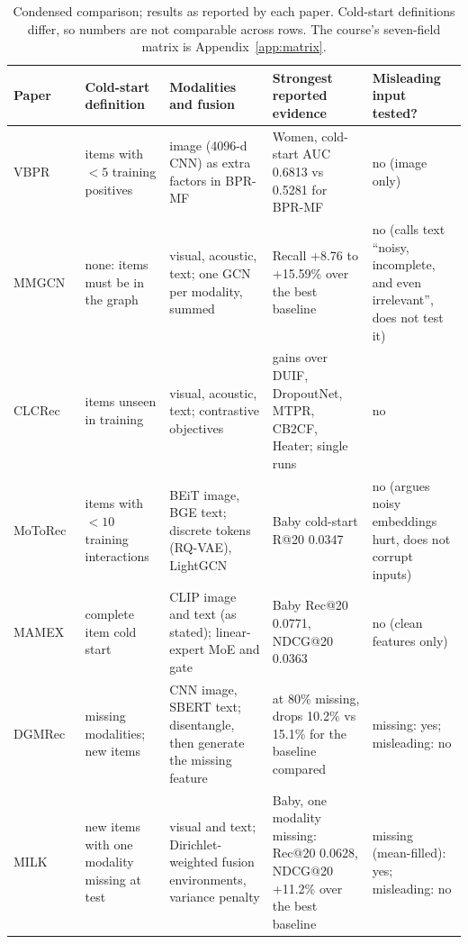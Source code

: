 \documentclass[conference]{IEEEtran}
\begin{document}
\begin{table}[!t]
\centering\footnotesize
\caption{Condensed comparison; results as reported by each paper. Cold-start definitions differ, so numbers are not comparable across rows. The course's seven-field matrix is Appendix~\ref{app:matrix}.}
\label{tab:lit}
\renewcommand{\arraystretch}{1.1}
\begin{tabularx}{\textwidth}{@{}p{1.8cm}p{3.0cm}XXp{2.6cm}@{}}
\toprule
Paper & Cold-start definition & Modalities and fusion & Strongest reported evidence & Misleading input tested? \\
\midrule
VBPR~\cite{he2016vbpr} & items with $<5$ training positives & image (4096-d CNN) as extra factors in BPR-MF & Women, cold-start AUC 0.6813 vs 0.5281 for BPR-MF & no (image only) \\
MMGCN~\cite{wei2019mmgcn} & none: items must be in the graph & visual, acoustic, text; one GCN per modality, summed & Recall +8.76 to +15.59\% over the best baseline & no (calls text ``noisy, incomplete, and even irrelevant'', does not test it) \\
CLCRec~\cite{wei2021clcrec} & items unseen in training & visual, acoustic, text; contrastive objectives & gains over DUIF, DropoutNet, MTPR, CB2CF, Heater; single runs & no \\
MoToRec~\cite{liu2026motorec} & items with $<10$ training interactions & BEiT image, BGE text; discrete tokens (RQ-VAE), LightGCN & Baby cold-start R@20 0.0347 & no (argues noisy embeddings hurt, does not corrupt inputs) \\
MAMEX~\cite{nguyen2025mamex} & complete item cold start & CLIP image and text (as stated); linear-expert MoE and gate & Baby Rec@20 0.0771, NDCG@20 0.0363 & no (clean features only) \\
DGMRec~\cite{kim2025dgmrec} & missing modalities; new items & CNN image, SBERT text; disentangle, then generate the missing feature & at 80\% missing, drops 10.2\% vs 15.1\% for the baseline compared & missing: yes; misleading: no \\
MILK~\cite{bai2024milk} & new items with one modality missing at test & visual and text; Dirichlet-weighted fusion environments, variance penalty & Baby, one modality missing: Rec@20 0.0628, NDCG@20 +11.2\% over the best baseline & missing (mean-filled): yes; misleading: no \\
\bottomrule
\end{tabularx}
\end{table}
\end{document}
